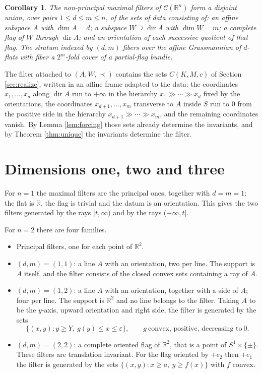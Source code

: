 \documentclass[11pt]{amsart}
\theoremstyle{plain}
\newtheorem{corollary}[theorem]{Corollary}
\theoremstyle{definition}
\DeclareMathOperator{\dir}{dir}
\newcommand{\CC}{\mathscr{C}}
\newcommand{\RR}{\mathbb{R}}
\begin{document}
\begin{corollary}\label{cor:strata}
The non-principal maximal filters of $\CC(\RR^n)$ form a disjoint union, over pairs $1\le d\le m\le n$, of the sets of data consisting of: an affine subspace $A$ with $\dim A=d$; a subspace $W\supseteq\dir A$ with $\dim W=m$; a complete flag of $W$ through $\dir A$; and an orientation of each successive quotient of that flag. The stratum indexed by $(d,m)$ fibers over the affine Grassmannian of $d$-flats with fiber a $2^{m}$-fold cover of a partial-flag bundle.
\end{corollary}

The filter attached to $(A,W,\prec)$ contains the sets $C(K,M,c)$ of Section \ref{sec:realize}, written in an affine frame adapted to the data: the coordinates $x_1,\dots,x_d$ along $\dir A$ run to $+\infty$ in the hierarchy $x_1\gg\cdots\gg x_d$ fixed by the orientations, the coordinates $x_{d+1},\dots,x_m$ transverse to $A$ inside $S$ run to $0$ from the positive side in the hierarchy $x_{d+1}\gg\cdots\gg x_m$, and the remaining coordinates vanish. By Lemma \ref{lem:forcing} those sets already determine the invariants, and by Theorem \ref{thm:unique} the invariants determine the filter.

\section{Dimensions one, two and three}\label{sec:low}

For $n=1$ the maximal filters are the principal ones, together with $d=m=1$: the flat is $\RR$, the flag is trivial and the datum is an orientation. This gives the two filters generated by the rays $[t,\infty)$ and by the rays $(-\infty,t]$.

For $n=2$ there are four families.
\begin{itemize}
\item Principal filters, one for each point of $\RR^2$.
\item $(d,m)=(1,1)$: a line $A$ with an orientation, two per line. The support is $A$ itself, and the filter consists of the closed convex sets containing a ray of $A$.
\item $(d,m)=(1,2)$: a line $A$ with an orientation, together with a side of $A$; four per line. The support is $\RR^2$ and no line belongs to the filter. Taking $A$ to be the $y$-axis, upward orientation and right side, the filter is generated by the sets
\[
\{(x,y):y\ge Y,\ g(y)\le x\le\varepsilon\},\qquad g\ \text{convex, positive, decreasing to}\ 0 .
\]
\item $(d,m)=(2,2)$: a complete oriented flag of $\RR^2$, that is a point of $S^{1}\times\{\pm\}$. These filters are translation invariant. For the flag oriented by $+e_2$ then $+e_1$ the filter is generated by the sets $\{(x,y):x\ge a,\ y\ge f(x)\}$ with $f$ convex.
\end{itemize}
\end{document}
